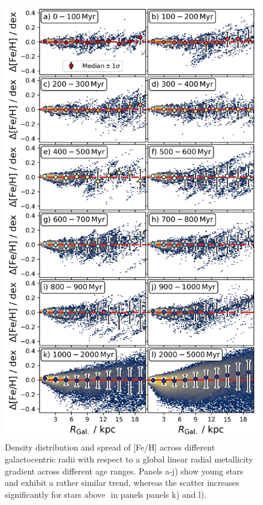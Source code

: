 \documentclass[fleqn,usenatbib]{mnras}
\begin{document}
\begin{figure}
    \centering
    \includegraphics[width=\columnwidth]{figures/scatter_with_increasing_age.png}
    \caption{Density distribution and spread of [Fe/H] across different galactocentric radii with respect to a global linear radial metallicity gradient across different age ranges. Panels a-j) show young stars and exhibit a rather similar trend, whereas the scatter increases significantly for stars above $$ in panels panels k) and l).}
    \label{fig:scatter_with_increasing_age}
\end{figure}
\end{document}
